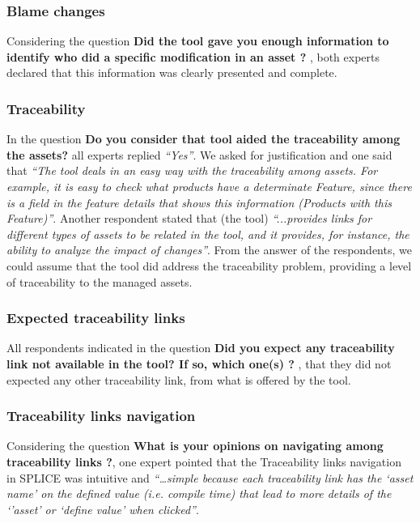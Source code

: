 \subsubsection{Blame changes}
Considering the question \textbf{ Did the tool gave you enough information to identify who did a specific modification in an asset ?} , both experts declared that this information was clearly presented and complete.

\subsubsection{Traceability}

In the question \textbf{Do you consider that tool aided the traceability among the assets?} all experts replied \textit{“Yes”}. We asked for justification and one said that \textit{“The tool deals in an easy way with the traceability among assets. For example, it is easy to check what products have a determinate Feature, since there is a field in the feature details that shows this information (Products with this Feature)”}.
Another respondent stated that (the tool) \textit{“...provides links for different types of assets to be related in the tool, and it provides, for instance, the ability to analyze the impact of changes”}. From the answer of the respondents, we could assume that the tool did address the traceability problem, providing a level of traceability to the managed assets.


\subsubsection{Expected traceability links}
All respondents indicated in the question \textbf{Did you expect any traceability link not available in the tool? If so, which one(s) ?} , that they did not expected any other traceability link, from what is offered by the tool.

\subsubsection{Traceability links navigation}
Considering the question \textbf{ What is your opinions on navigating among traceability links ?}, one expert pointed that the Traceability links navigation in \ac{SPLICE} was intuitive and \textit{“…simple because each traceability link has the ‘asset name’ on the defined value (i.e. compile time) that lead to more details of the ‘’asset’ or ‘define value’ when clicked”}. 

